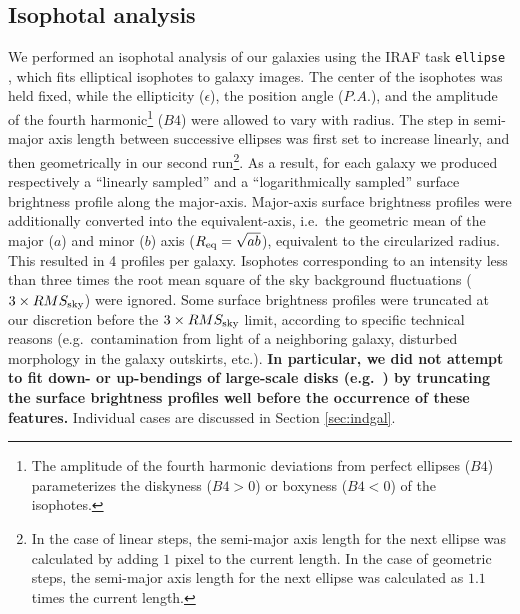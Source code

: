 \documentclass[preprint2]{emulateapj}
\begin{document}
\subsection{Isophotal analysis}
We performed an isophotal analysis of our galaxies using the IRAF task {\tt ellipse} \citep{taskellipse}, 
which fits elliptical isophotes to galaxy images.
The center of the isophotes was held fixed, while the ellipticity ($\epsilon$), the position angle ($P.A.$),  
and the amplitude of the fourth harmonic\footnote{The amplitude of the fourth harmonic deviations from perfect ellipses 
($B4$) parameterizes the diskyness ($B4>0$) or boxyness ($B4<0$) of the isophotes.} ($B4$) were allowed to vary with radius.
The step in semi-major axis length between successive ellipses was first set to increase linearly, 
and then geometrically in our second run\footnote{In the case of linear steps, 
the semi-major axis length for the next ellipse was calculated by adding $1$ pixel to the current length.
In the case of geometric steps, the semi-major axis length for the next ellipse 
was calculated as $1.1$ times the current length.}.
As a result, for each galaxy we produced respectively a ``linearly sampled'' and a ``logarithmically sampled'' 
surface brightness profile along the major-axis. 
Major-axis surface brightness profiles were additionally converted into the equivalent-axis,
i.e.~the geometric mean of the major ($a$) and minor ($b$) axis ($R_{\rm eq} = \sqrt{ab}$), 
equivalent to the circularized radius.
This resulted in 4 profiles per galaxy.
Isophotes corresponding to an intensity less than 
three times the root mean square of the sky background fluctuations ($3 \times RMS_{\rm sky}$) were ignored.
Some surface brightness profiles were truncated at our discretion before the $3 \times RMS_{\rm sky}$ limit, 
according to specific technical reasons (e.g.~contamination from light of a neighboring galaxy, 
disturbed morphology in the galaxy outskirts, etc.). 
{\bf In particular, we did not attempt to fit down- or up-bendings of large-scale disks 
(e.g.~\citealt{erwin2005,erwin2008,erwin2012,gutierrez2011,comeron2012,munozmateos2013,kim2014}) 
by truncating the surface brightness profiles well before the occurrence of these features. }
Individual cases are discussed in Section \ref{sec:indgal}.
\end{document}
